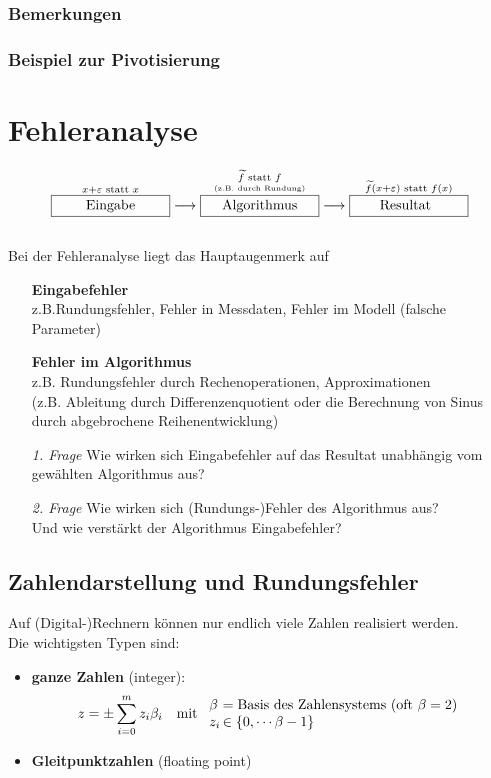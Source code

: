 \documentclass[ngerman,fontsize=11pt, paper=a4, parskip=half, titlepage=true, toc=bib]{scrbook}
\newcommand{\sectione}[1]{\section{#1} \setcounter{equation}{0}}
\begin{document}
\subsection{Bemerkungen}
\subsection{Beispiel zur Pivotisierung}


\chapter{Fehleranalyse} \label{3}
%
\begin{align*}
	\overset{x+\varepsilon \text{ statt } x}{\framebox[3cm]{Eingabe}} \longrightarrow 
	\overset{\underset{\text{\tiny (z.B. durch Rundung)}}{\widetilde{f} \text{ statt } f}}{\framebox[3cm]{Algorithmus}} \longrightarrow
	\overset{\widetilde{f}(x+\varepsilon) \text{ statt } f(x)}{\framebox[3cm]{Resultat\phantom{g}}}
\end{align*}\\

Bei der Fehleranalyse liegt das Hauptaugenmerk auf
\begin{itemize}
	\item[] \textbf{Eingabefehler}\\ z.B.Rundungsfehler, Fehler in Messdaten, Fehler im Modell (falsche Parameter)
	\item[] \textbf{Fehler im Algorithmus} \\ z.B. Rundungsfehler durch Rechenoperationen, Approximationen \\
	 (z.B. Ableitung durch Differenzenquotient oder die Berechnung von Sinus durch abgebrochene Reihenentwicklung)
	\\
	\item[\textit{1. Frage}] Wie wirken sich Eingabefehler auf das Resultat unabhängig vom gewählten Algorithmus aus?
		\item[\textit{2. Frage}]Wie wirken sich (Rundungs-)Fehler des Algorithmus aus?\\
											Und wie verstärkt der Algorithmus Eingabefehler?
\end{itemize}


\sectione{Zahlendarstellung und Rundungsfehler} \label{3.1}  
Auf (Digital-)Rechnern können nur endlich viele Zahlen realisiert werden. \\
Die wichtigsten Typen sind: 
\begin{itemize}
	\item \textbf{ganze Zahlen}  (integer):
					\begin{align*}
						 z&=\pm \sum_{i=0}^{m}z_i\beta_i & \text{mit }
						 \begin{array}{l@{\,}l}
							 \beta &= \text{Basis des Zahlensystems (oft $\beta=2$)} \\
							 z_i &\in \{0, \cdots \beta-1\}
						 \end{array}
						\end{align*}
	\item \textbf{Gleitpunktzahlen} (floating point) 
\end{itemize}
\end{document}
